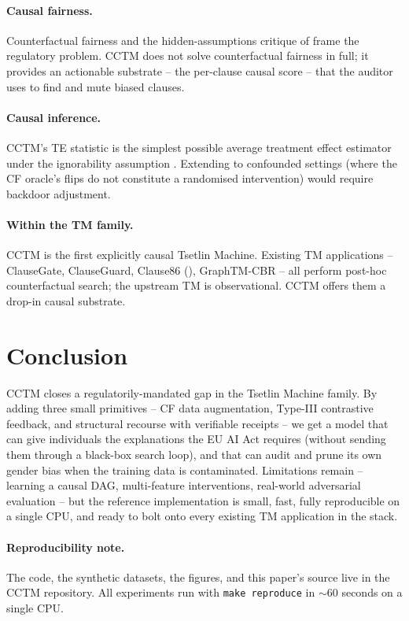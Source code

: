 \documentclass[11pt]{article}
\begin{document}
\paragraph{Causal fairness.}  Counterfactual fairness \citep{kusner2017counterfactual} and the hidden-assumptions critique of \citet{barocas2020hidden} frame the regulatory problem.  CCTM does not solve counterfactual fairness in full; it provides an actionable substrate -- the per-clause causal score -- that the auditor uses to find and mute biased clauses.

\paragraph{Causal inference.}  CCTM's TE statistic is the simplest possible average treatment effect estimator under the ignorability assumption \citep{rubin2005causal,pearl2009causality}.  Extending to confounded settings (where the CF oracle's flips do not constitute a randomised intervention) would require backdoor adjustment.

\paragraph{Within the TM family.}  CCTM is the first explicitly causal Tsetlin Machine.  Existing TM applications -- ClauseGate, ClauseGuard, Clause86 (\citealp{anwar2026hgtm}), GraphTM-CBR -- all perform post-hoc counterfactual search; the upstream TM is observational.  CCTM offers them a drop-in causal substrate.

\section{Conclusion}

CCTM closes a regulatorily-mandated gap in the Tsetlin Machine family.  By adding three small primitives -- CF data augmentation, Type-III contrastive feedback, and structural recourse with verifiable receipts -- we get a model that can give individuals the explanations the EU AI Act requires (without sending them through a black-box search loop), and that can audit and prune its own gender bias when the training data is contaminated.  Limitations remain -- learning a causal DAG, multi-feature interventions, real-world adversarial evaluation -- but the reference implementation is small, fast, fully reproducible on a single CPU, and ready to bolt onto every existing TM application in the stack.

\paragraph{Reproducibility note.}  The code, the synthetic datasets, the figures, and this paper's source live in the CCTM repository.  All experiments run with \texttt{make reproduce} in $\sim$$60$ seconds on a single CPU.


\end{document}
